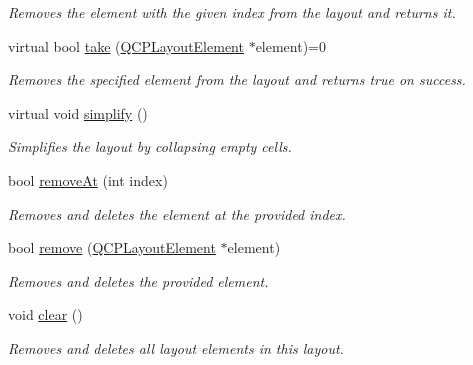 \begin{DoxyCompactItemize}
\begin{DoxyCompactList}\small\item\em Removes the element with the given {\itshape index} from the layout and returns it. \end{DoxyCompactList}\item 
virtual bool \hyperlink{classQCPLayout_ada26cd17e56472b0b4d7fbbc96873e4c}{take} (\hyperlink{classQCPLayoutElement}{Q\+C\+P\+Layout\+Element} $\ast$element)=0
\begin{DoxyCompactList}\small\item\em Removes the specified {\itshape element} from the layout and returns true on success. \end{DoxyCompactList}\item 
virtual void \hyperlink{classQCPLayout_a41e6ac049143866e8f8b4964efab01b2}{simplify} ()
\begin{DoxyCompactList}\small\item\em Simplifies the layout by collapsing empty cells. \end{DoxyCompactList}\item 
bool \hyperlink{classQCPLayout_a2403f684fee3ce47132faaeed00bb066}{remove\+At} (int index)
\begin{DoxyCompactList}\small\item\em Removes and deletes the element at the provided {\itshape index}. \end{DoxyCompactList}\item 
bool \hyperlink{classQCPLayout_a6c58f537d8086f352576ab7c5b15d0bc}{remove} (\hyperlink{classQCPLayoutElement}{Q\+C\+P\+Layout\+Element} $\ast$element)
\begin{DoxyCompactList}\small\item\em Removes and deletes the provided {\itshape element}. \end{DoxyCompactList}\item 
void \hyperlink{classQCPLayout_a02883bdf2769b5b227f0232dba1ac4ee}{clear} ()
\begin{DoxyCompactList}\small\item\em Removes and deletes all layout elements in this layout. \end{DoxyCompactList}\end{DoxyCompactItemize}
